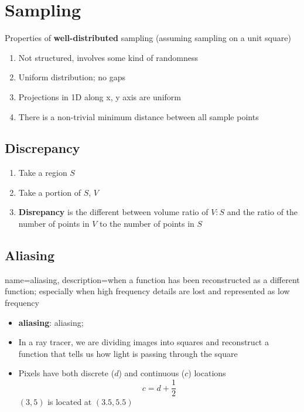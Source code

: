 \chapter{Sampling}

Properties of \textbf{well-distributed} sampling (assuming sampling on
a unit square)
\begin{enumerate}
  \item Not structured, involves some kind of randomness
  \item Uniform distribution; no gaps
  \item Projections in 1D along x, y axis are uniform
  \item There is a non-trivial minimum distance between all sample points
\end{enumerate}

\section{Discrepancy}

  \begin{enumerate}
    \item Take a region $ S $
    \item Take a portion of $ S $, $ V $
    \item \textbf{Disrepancy} is the different between volume ratio of $ V:S $
    and the ratio of the number of points in $ V $ to the number of points in
    $ S $
  \end{enumerate}

\section{Aliasing}

  {
    name=aliasing,
    description={when a function has been reconstructed as a
    different function; especially when high frequency details are lost and
    represented as low frequency}
  }

  \begin{itemize}
    \item \textbf{\Gls{aliasing}}: \Glsdesc{aliasing};
    \item In a ray tracer, we are dividing images into squares and reconstruct
    a function that tells us how light is passing through the square
    \item Pixels have both discrete ($ d $) and continuous ($ c $) locations
    \begin{equation}
      c = d + \frac{1}{2}
    \end{equation}
    $ \left( 3, 5 \right) $ is located at $ \left( 3.5, 5.5 \right) $
  \end{itemize}

